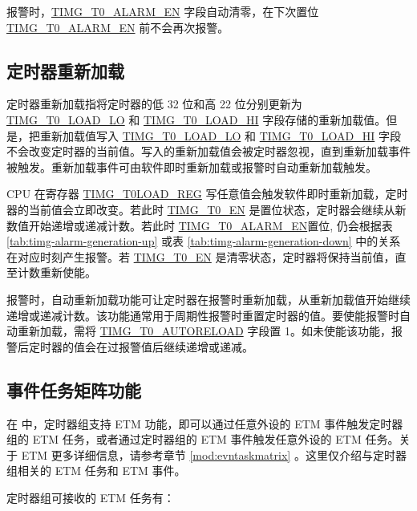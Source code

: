 \documentclass[main\_\_CN.tex]{subfiles}
\begin{document}
报警时，\hyperref[fielddesc:TIMGTXALARMEN]{TIMG\_T0\_ALARM\_EN} 字段自动清零，在下次置位 \hyperref[fielddesc:TIMGTXALARMEN]{TIMG\_T0\_ALARM\_EN} 前不会再次报警。



\subsection{定时器重新加载} \label{sec:timg-func-descr-reload}
定时器重新加载指将定时器的低 32 位和高 22 位分别更新为 \hyperref[fielddesc:TIMGTXLOADLO]{TIMG\_T0\_LOAD\_LO} 和 \hyperref[fielddesc:TIMGTXLOADHI]{TIMG\_T0\_LOAD\_HI} 字段存储的重新加载值。但是，把重新加载值写入 \hyperref[fielddesc:TIMGTXLOADLO]{TIMG\_T0\_LOAD\_LO} 和 \hyperref[fielddesc:TIMGTXLOADHI]{TIMG\_T0\_LOAD\_HI} 字段不会改变定时器的当前值。写入的重新加载值会被定时器忽视，直到重新加载事件被触发。重新加载事件可由软件即时重新加载或报警时自动重新加载触发。

CPU 在寄存器 \hyperref[regdesc:TIMGTXLOADREG]{TIMG\_T0LOAD\_REG} 写任意值会触发软件即时重新加载，定时器的当前值会立即改变。若此时 \hyperref[fielddesc:TIMGTXEN]{TIMG\_T0\_EN} 是置位状态，定时器会继续从新数值开始递增或递减计数。若此时 \hyperref[fielddesc:TIMGTXALARMEN]{TIMG\_T0\_ALARM\_EN}置位, 仍会根据表 \ref{tab:timg-alarm-generation-up} 或表 \ref{tab:timg-alarm-generation-down} 中的关系在对应时刻产生报警。若 \hyperref[fielddesc:TIMGTXEN]{TIMG\_T0\_EN} 是清零状态，定时器将保持当前值，直至计数重新使能。

报警时，自动重新加载功能可让定时器在报警时重新加载，从重新加载值开始继续递增或递减计数。该功能通常用于周期性报警时重置定时器的值。要使能报警时自动重新加载，需将 \hyperref[fielddesc:TIMGTXAUTORELOAD]{TIMG\_T0\_AUTORELOAD} 字段置 1。如未使能该功能，报警后定时器的值会在过报警值后继续递增或递减。



\subsection{事件任务矩阵功能} \label{sec:timg-etm-func}


在 \chipname{} 中，定时器组支持 ETM 功能，即可以通过任意外设的 ETM 事件触发定时器组的 ETM 任务，或者通过定时器组的 ETM 事件触发任意外设的 ETM 任务。关于 ETM 更多详细信息，请参考章节 \ref{mod:evntaskmatrix} 。这里仅介绍与定时器组相关的 ETM 任务和 ETM 事件。

定时器组可接收的 ETM 任务有：
\end{document}
